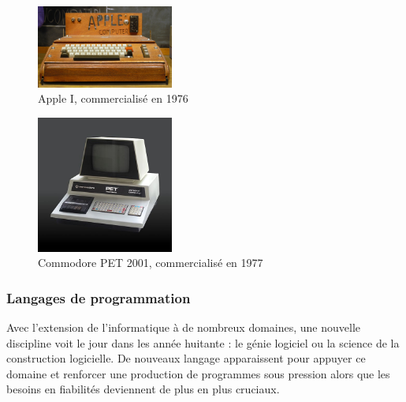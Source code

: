 \documentclass[a4paper,11pt]{book}
\begin{document}
\begin{figure}[h]
    \centering
    \includegraphics[width=0.4\textwidth]{media/machines/1920px-Apple_I_Computer.jpeg}
    \caption{Apple I, commercialisé en 1976}
    \label{AppleI}
\end{figure}

\begin{figure}[h]
    \centering
    \includegraphics[width=0.4\textwidth]{media/machines/520px-Commodore_2001_Series-IMG_0448b.jpeg}
    \caption{Commodore PET 2001, commercialisé en 1977}
    \label{PET}
\end{figure}

\subsubsection{Langages de programmation}
Avec l'extension de l'informatique à de nombreux domaines, une nouvelle discipline voit le jour dans les année huitante : le génie logiciel ou la science de la construction logicielle. De nouveaux langage apparaissent pour appuyer ce domaine et renforcer une production de programmes sous pression alors que les besoins en fiabilités deviennent de plus en plus cruciaux.
\end{document}
